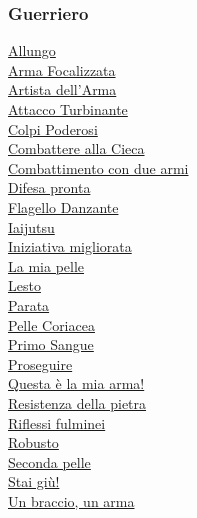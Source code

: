 \begin{multicols}{3}

{\small


\begin{flushleft}

\titlespacing*{\subsubsection}{0pt}{0.5em}{0.5em}\subsubsection*{Guerriero}

\hyperlink{Allungo}{Allungo}\\
\hyperlink{Arma Focalizzata}{Arma Focalizzata}\\
\hyperlink{Artista dell'Arma}{Artista dell'Arma}\\
\hyperlink{Attacco Turbinante}{Attacco Turbinante}\\
\hyperlink{Colpi Poderosi}{Colpi Poderosi}\\
\hyperlink{Combattere alla Cieca}{Combattere alla Cieca}\\
\hyperlink{Combattimento con due armi}{Combattimento con due armi}\\
\hyperlink{Difesa pronta}{Difesa pronta}\\
\hyperlink{Flagello Danzante}{Flagello Danzante}\\
\hyperlink{Iaijutsu}{Iaijutsu}\\
\hyperlink{Iniziativa migliorata}{Iniziativa migliorata}\\
\hyperlink{La mia pelle}{La mia pelle}\\
\hyperlink{Lesto}{Lesto}\\
\hyperlink{Parata}{Parata}\\
\hyperlink{Pelle Coriacea}{Pelle Coriacea}\\
\hyperlink{Primo Sangue}{Primo Sangue}\\
\hyperlink{Proseguire}{Proseguire}\\
\hyperlink{Questa è la mia arma!}{Questa è la mia arma!}\\
\hyperlink{Resistenza della pietra}{Resistenza della pietra}\\
\hyperlink{Riflessi fulminei}{Riflessi fulminei}\\
\hyperlink{Robusto}{Robusto}\\
\hyperlink{Seconda pelle}{Seconda pelle}\\
\hyperlink{Stai giù!}{Stai giù!}\\
\hyperlink{Un braccio, un arma}{Un braccio, un arma}


\end{flushleft}}
\end{multicols}
